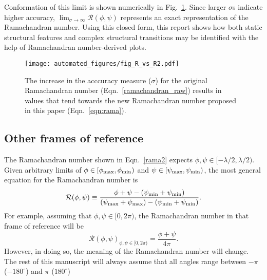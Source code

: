\documentclass[fleqn,10pt,lineno]{wlpeerj} %
\newcommand{\Fig}[1]{Fig.~\ref{#1}}
\newcommand{\Eqn}[1]{Eqn.~\ref{#1}}
\begin{document}
Conformation of this limit is shown numerically in \Fig{fig:sigma}. Since larger $\sigma$s indicate higher accuracy, $\displaystyle\lim_{\sigma\to\infty}{\mathcal{R}}(\phi,\psi)$ represents an exact representation of the Ramachandran number. Using this closed form, this report shows how both static structural features and complex structural transitions may be identified with the help of Ramachandran number-derived plots.

\begin{figure}[t!]
\centering
\texttt{[image: automated\_figures/fig\_R\_vs\_R2.pdf]}
\caption{The increase in the acccuracy measure ($\sigma$) for the original Ramachandran number (\Eqn{ramachandran_raw}) results in values that tend towards the new Ramachandran number proposed in this paper (\Eqn{eqn:rama}).\label{fig:sigma}} 
\end{figure}

\subsection{Other frames of reference}
The Ramachandran number shown in \Eqn{rama2} expects $\phi,\psi \in [-\lambda/2,\lambda/2)$. Given arbitrary limits of $\phi \in [\phi_{\rm max},\phi_{\rm min})$ and $\psi \in [\psi_{\rm max},\psi_{\rm min})$, the most general equation for the Ramachandran number is
\begin{equation}
{\mathcal{R}}(\phi,\psi) \equiv  \frac{\phi+\psi-(\psi_{\rm min}+\psi_{\rm min})}{(\psi_{\rm max}+\psi_{\rm max})-(\psi_{\rm min}+\psi_{\rm min})}.
\label{ramaGeneral}
\end{equation}
For example, assuming that $\phi,\psi \in [0,2\pi)$, the Ramachandran number in that frame of reference will be
\begin{equation}
{\mathcal{R}}(\phi,\psi)_{\phi,\psi \in [0,2\pi)} = \frac{\phi+\psi}{4\pi}.
\label{ramaGeneral}
\end{equation}
However, in doing so, the meaning of the Ramachandran number will change. The rest of this manuscript will always assume that all angles range between $-\pi$ ($-180^\circ$) and $\pi$ ($180^\circ$)


\end{document}
